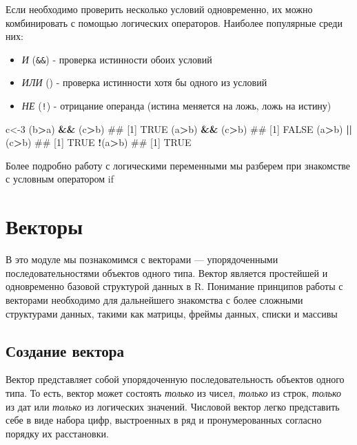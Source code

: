 \documentclass[]{book}
\newenvironment{Shaded}{\begin{snugshade}}{\end{snugshade}}
\newcommand{\DecValTok}[1]{\textcolor[rgb]{0.00,0.00,0.81}{#1}}
\newcommand{\StringTok}[1]{\textcolor[rgb]{0.31,0.60,0.02}{#1}}
\newcommand{\OperatorTok}[1]{\textcolor[rgb]{0.81,0.36,0.00}{\textbf{#1}}}
\newcommand{\NormalTok}[1]{#1}
\providecommand{\tightlist}{%
  \setlength{\itemsep}{0pt}\setlength{\parskip}{0pt}}
\begin{document}
Если необходимо проверить несколько условий одновременно, их можно
комбинировать с помощью логических операторов. Наиболее популярные среди
них:

\begin{itemize}
\tightlist
\item
  \emph{И} (\texttt{\&\&}) - проверка истинности обоих условий
\item
  \emph{ИЛИ} (\texttt{\textbar{}\textbar{}}) - проверка истинности хотя
  бы одного из условий
\item
  \emph{НЕ} (\texttt{!}) - отрицание операнда (истина меняется на ложь,
  ложь на истину)
\end{itemize}

\begin{Shaded}
\begin{Highlighting}[]
\NormalTok{c<-}\DecValTok{3}
\NormalTok{(b}\OperatorTok{>}\NormalTok{a) }\OperatorTok{&&}\StringTok{ }\NormalTok{(c}\OperatorTok{>}\NormalTok{b)}
\NormalTok{## [1] TRUE}
\NormalTok{(a}\OperatorTok{>}\NormalTok{b) }\OperatorTok{&&}\StringTok{ }\NormalTok{(c}\OperatorTok{>}\NormalTok{b)}
\NormalTok{## [1] FALSE}
\NormalTok{(a}\OperatorTok{>}\NormalTok{b) }\OperatorTok{||}\StringTok{ }\NormalTok{(c}\OperatorTok{>}\NormalTok{b)}
\NormalTok{## [1] TRUE}
\OperatorTok{!}\NormalTok{(a}\OperatorTok{>}\NormalTok{b)}
\NormalTok{## [1] TRUE}
\end{Highlighting}
\end{Shaded}

Более подробно работу с логическими переменными мы разберем при
знакомстве с условным оператором if

\chapter{Векторы}\label{vectors}

В это модуле мы познакомимся с векторами --- упорядоченными
последовательностями объектов одного типа. Вектор является простейшей и
одновременно базовой структурой данных в R. Понимание принципов работы с
векторами необходимо для дальнейшего знакомства с более сложными
структурами данных, такими как матрицы, фреймы данных, списки и массивы

\section{Создание вектора}\label{-}

Вектор представляет собой упорядоченную последовательность объектов
одного типа. То есть, вектор может состоять \emph{только} из чисел,
\emph{только} из строк, \emph{только} из дат или \emph{только} из
логических значений. Числовой вектор легко представить себе в виде
набора цифр, выстроенных в ряд и пронумерованных согласно порядку их
расстановки.
\end{document}
